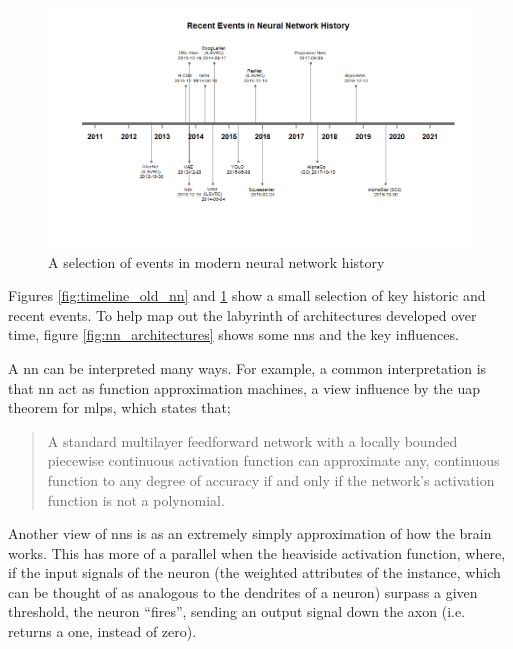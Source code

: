 \begin{figure}
    \centering
    \includegraphics[width=140mm,scale=1.5]{figs/timeline_new_nn.png}
    \caption{A selection of events in modern neural network history}
    \label{fig:timeline_new_nn}
\end{figure}

Figures \ref{fig:timeline_old_nn} and \ref{fig:timeline_new_nn} show a small selection of key historic and recent events. To help map out the labyrinth of architectures developed over time, figure \ref{fig:nn_architectures} shows some \gls{nn}s and the key influences.


A \gls{nn} can be interpreted many ways. For example, a common interpretation is that \gls{nn} act as function approximation machines, a view influence by the \gls{uap} theorem for \gls{mlp}s, which states that;

\begin{quote}
    A standard multilayer feedforward network with a locally bounded piecewise continuous activation function can approximate any, continuous function to any degree of accuracy if and only if the network's activation function is not a polynomial.\cite{uap_mlp}
\end{quote}

Another view of \gls{nn}s is as an extremely simply approximation of how the brain works. This has more of a parallel when the heaviside activation function, where, if the input signals of the neuron (the weighted attributes of the \gls{instance}, which can be thought of as analogous to the dendrites of a neuron) surpass a given threshold, the neuron \enquote{fires}, sending an output signal down the axon (i.e. returns a one, instead of zero).
\bigskip

